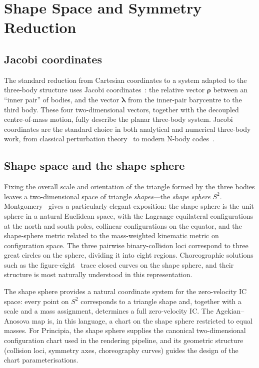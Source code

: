 \documentclass[11pt,a4paper]{article}
\begin{document}
\section{Shape Space and Symmetry Reduction}

\subsection{Jacobi coordinates}

The standard reduction from Cartesian coordinates to a system adapted to the three-body
structure uses Jacobi coordinates~\cite{jacobi1842}: the relative vector $\boldsymbol{\rho}$
between an ``inner pair'' of bodies, and the vector $\boldsymbol{\lambda}$ from the inner-pair
barycentre to the third body.  These four two-dimensional vectors, together with the decoupled
centre-of-mass motion, fully describe the planar three-body system.  Jacobi coordinates are
the standard choice in both analytical and numerical three-body work, from classical perturbation
theory~\cite{poincare1892} to modern N-body codes~\cite{rein2012}.

\subsection{Shape space and the shape sphere}

Fixing the overall scale and orientation of the triangle formed by the three bodies leaves a
two-dimensional space of triangle \emph{shapes}---the \emph{shape sphere} $S^2$.
Montgomery~\cite{montgomery2015} gives a particularly elegant exposition: the shape sphere is
the unit sphere in a natural Euclidean space, with the Lagrange equilateral configurations at
the north and south poles, collinear configurations on the equator, and the shape-sphere metric
related to the mass-weighted kinematic metric on configuration space.  The three pairwise
binary-collision loci correspond to three great circles on the sphere, dividing it into eight
regions.  Choreographic solutions such as the figure-eight~\cite{chenciner2000} trace closed
curves on the shape sphere, and their structure is most naturally understood in this
representation.

The shape sphere provides a natural coordinate system for the zero-velocity IC space: every
point on $S^2$ corresponds to a triangle shape and, together with a scale and a mass
assignment, determines a full zero-velocity IC.  The Agekian--Anosova map is, in this language,
a chart on the shape sphere restricted to equal masses.  For Principia, the shape sphere
supplies the canonical two-dimensional configuration chart used in the rendering pipeline, and
its geometric structure (collision loci, symmetry axes, choreography curves) guides the design
of the chart parameterisations.
\end{document}
